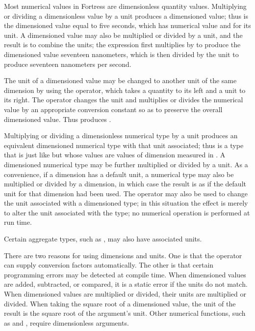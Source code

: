 Most numerical values in Fortress are dimensionless quantity values.
Multiplying or dividing a dimensionless value by a unit produces a dimensioned value;
thus  is the dimensioned value equal to five seconds, which has
numerical value  and  for its unit.
A dimensioned value may also be
multiplied or divided by a unit, and the result is to combine the units;
the expression
first multiplies  by
 to produce the dimensioned value seventeen nanometers,
which is then divided by the unit 
to produce seventeen nanometers per second.

The unit of a dimensioned value may be changed to another unit of the same dimension
by using the  operator, which takes a quantity to its left and a unit to its right.
The  operator changes the unit and multiplies or divides the numerical value
by an appropriate conversion constant so as to preserve the overall dimensioned value.
Thus  produces .

Multiplying or dividing a dimensionless numerical type by a unit produces an equivalent
dimensioned numerical type with that unit associated; thus  is a
type that is just like  but whose values are values of dimension
 measured in .  A dimensioned numerical type may be
further multiplied or divided by a unit.
As a convenience,
if a dimension has a default unit, a numerical type may
also be multiplied or divided by a dimension, in which case the result is as if
the default unit for that dimension had been used.
The  operator may also
be used to change the unit associated with a dimensioned type; in this situation
the effect is merely to alter the unit associated with the type; no numerical
operation is performed at run time.

Certain aggregate types, such as , may also have associated units.

There are two reasons for using dimensions and units.  One is that the 
operator can supply conversion factors automatically.  The other is that
certain programming errors may be detected at compile time.
When dimensioned values are added, subtracted, or compared,
it is a static error if the units do not match.
When dimensioned values are multiplied or divided, their units
are multiplied or divided.  When taking the square root of a dimensioned
value, the unit of the result is the square root of the argument's unit.
Other numerical functions, such as \EXP{\sin} and \EXP{\log}, require
dimensionless arguments.

